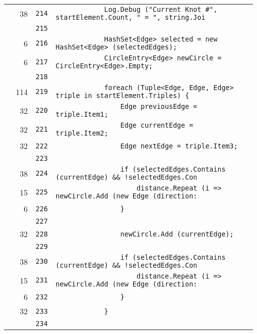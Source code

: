\documentclass[a4paper,10pt]{article}
\begin{document}
\begin{longtable}[l]{lrrl}
\cellcolor{green} & 38 & \verb~214~ & \verb~            Log.Debug ("Current Knot #", startElement.Count, " = ", string.Joi~\\
\cellcolor{gray} &  & \verb~215~ & \verb~~\\
\cellcolor{green} & 6 & \verb~216~ & \verb~            HashSet<Edge> selected = new HashSet<Edge> (selectedEdges);~\\
\cellcolor{green} & 6 & \verb~217~ & \verb~            CircleEntry<Edge> newCircle = CircleEntry<Edge>.Empty;~\\
\cellcolor{gray} &  & \verb~218~ & \verb~~\\
\cellcolor{green} & 114 & \verb~219~ & \verb~            foreach (Tuple<Edge, Edge, Edge> triple in startElement.Triples) {~\\
\cellcolor{green} & 32 & \verb~220~ & \verb~                Edge previousEdge = triple.Item1;~\\
\cellcolor{green} & 32 & \verb~221~ & \verb~                Edge currentEdge = triple.Item2;~\\
\cellcolor{green} & 32 & \verb~222~ & \verb~                Edge nextEdge = triple.Item3;~\\
\cellcolor{gray} &  & \verb~223~ & \verb~~\\
\cellcolor{green} & 38 & \verb~224~ & \verb~                if (selectedEdges.Contains (currentEdge) && !selectedEdges.Con~\\
\cellcolor{green} & 15 & \verb~225~ & \verb~                    distance.Repeat (i => newCircle.Add (new Edge (direction: ~\\
\cellcolor{green} & 6 & \verb~226~ & \verb~                }~\\
\cellcolor{gray} &  & \verb~227~ & \verb~~\\
\cellcolor{green} & 32 & \verb~228~ & \verb~                newCircle.Add (currentEdge);~\\
\cellcolor{gray} &  & \verb~229~ & \verb~~\\
\cellcolor{green} & 38 & \verb~230~ & \verb~                if (selectedEdges.Contains (currentEdge) && !selectedEdges.Con~\\
\cellcolor{green} & 15 & \verb~231~ & \verb~                    distance.Repeat (i => newCircle.Add (new Edge (direction: ~\\
\cellcolor{green} & 6 & \verb~232~ & \verb~                }~\\
\cellcolor{green} & 32 & \verb~233~ & \verb~            }~\\
\cellcolor{gray} &  & \verb~234~ & \verb~~\\

\end{longtable}
\end{document}
